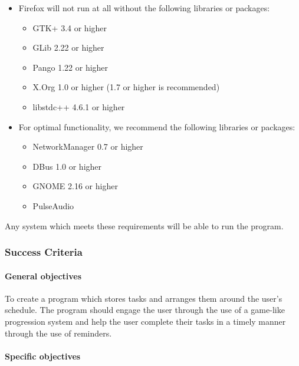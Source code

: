 \documentclass[]{article}
\let\oldparagraph\paragraph
\renewcommand{\paragraph}[1]{\oldparagraph{#1}\mbox{}}
\begin{document}
\begin{itemize}
\item
  Firefox will not run at all without the following libraries or
  packages:

  \begin{itemize}
  \item
    GTK+ 3.4 or higher
  \item
    GLib 2.22 or higher
  \item
    Pango 1.22 or higher
  \item
    X.Org 1.0 or higher (1.7 or higher is recommended)
  \item
    libstdc++ 4.6.1 or higher
  \end{itemize}
\item
  For optimal functionality, we recommend the following libraries or
  packages:

  \begin{itemize}
  \item
    NetworkManager 0.7 or higher
  \item
    DBus 1.0 or higher
  \item
    GNOME 2.16 or higher
  \item
    PulseAudio
  \end{itemize}
\end{itemize}

Any system which meets these requirements will be able to run the
program.

\hypertarget{success-criteria}{%
\subsubsection{Success Criteria}\label{success-criteria}}

\hypertarget{general-objectives}{%
\paragraph{General objectives}\label{general-objectives}}

To create a program which stores tasks and arranges them around the
user's schedule. The program should engage the user through the use of a
game-like progression system and help the user complete their tasks in a
timely manner through the use of reminders.

\hypertarget{specific-objectives}{%
\paragraph{Specific objectives}\label{specific-objectives}}
\end{document}
